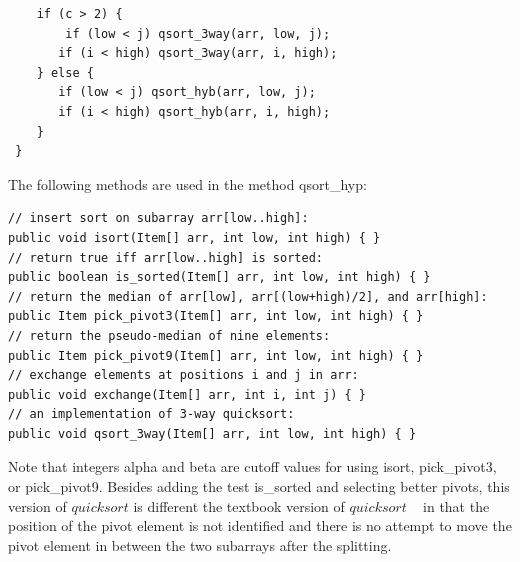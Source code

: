 \documentclass[AMA,STIX1COL]{WileyNJD-v2}
\newcommand{\qusort}{$quicksort$ }
\begin{document}
\begin{lstlisting}
    if (c > 2) {                                                                                                                                             
    	if (low < j) qsort_3way(arr, low, j);                                                                                                           
       if (i < high) qsort_3way(arr, i, high);                                                                                                                      
    } else {                                                                                                                                                 
       if (low < j) qsort_hyb(arr, low, j);                                                                                                           
       if (i < high) qsort_hyb(arr, i, high);                                                                                                              
    }                                                                                                                                                        
 }           
\end{lstlisting}

The following methods are used in the method qsort\_hyp: 
\begin{lstlisting}
// insert sort on subarray arr[low..high]:
public void isort(Item[] arr, int low, int high) { }
// return true iff arr[low..high] is sorted:        
public boolean is_sorted(Item[] arr, int low, int high) { }
// return the median of arr[low], arr[(low+high)/2], and arr[high]:
public Item pick_pivot3(Item[] arr, int low, int high) { }
// return the pseudo-median of nine elements:
public Item pick_pivot9(Item[] arr, int low, int high) { }
// exchange elements at positions i and j in arr:
public void exchange(Item[] arr, int i, int j) { }
// an implementation of 3-way quicksort: 
public void qsort_3way(Item[] arr, int low, int high) { }      
\end{lstlisting}

Note that integers alpha and beta are cutoff values for using isort, pick\_pivot3, or pick\_pivot9. Besides adding the test is\_sorted and selecting better pivots, this version of \qusort is different the textbook version of \qusort~\cite{10.5555/1614191} in that the position of the pivot element is not identified and there is no attempt to move the pivot element in between the two subarrays after the splitting. 
\end{document}
